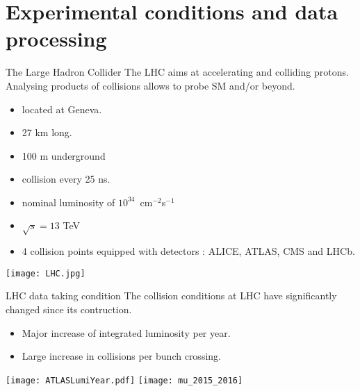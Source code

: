 \section{Experimental conditions and data processing}
\frame{\tableofcontents[currentsection]}

\begin{frame}{The Large Hadron Collider}
  The LHC aims at accelerating and colliding protons.
  Analysing products of collisions allows to probe SM and/or beyond.
  \vfill
  
  \begin{minipage}{0.49\linewidth}
    \begin{itemize}
    \item located at Geneva.
    \item 27 km long.
    \item 100 m underground
    \item collision every 25 ns.
    \item nominal luminosity of $10^{34}$~cm$^{-2}$s$^{-1}$
    \item $\sqrt{s}=13$ TeV
    \item 4 collision points equipped with detectors : ALICE, ATLAS, CMS and LHCb.
    \end{itemize}
    \end{minipage}
  \hfill
  \begin{minipage}{0.49\linewidth}
    \texttt{[image: LHC.jpg]}
    \end{minipage}
\end{frame}
\begin{frame}{LHC data taking condition}
  The collision conditions at LHC have significantly changed since its contruction.
  \begin{itemize}
  \item Major increase of integrated luminosity per year.
  \item Large increase in collisions per bunch crossing.
  \end{itemize}

  \begin{center} \texttt{[image: ATLASLumiYear.pdf]}
  \texttt{[image: mu\_2015\_2016]} \end{center}
\end{frame}
